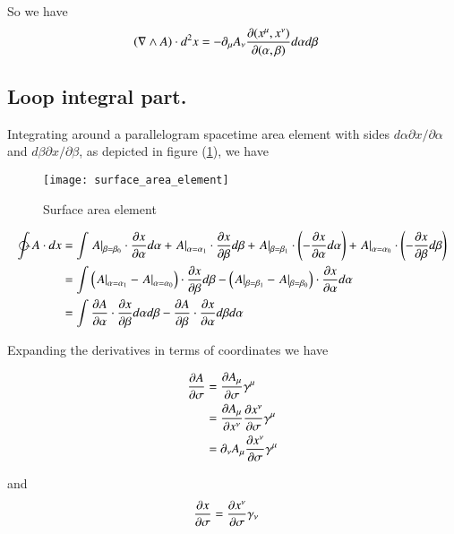 So we have
\begin{align}\label{eqn:withJac}
( \grad \wedge A ) \cdot d^2 x &= -\partial_\mu A_\nu \frac{\partial (x^\mu, x^\nu)}{\partial (\alpha, \beta)} d\alpha d\beta
\end{align}

\subsection{Loop integral part.}

Integrating around a parallelogram spacetime area element with sides $d\alpha \partial x/\partial \alpha$ and $d\beta \partial x/\partial \beta$, as
depicted in figure (\ref{fig:surface_area_element}), we have

\begin{figure}[htp]
\centering
\texttt{[image: surface\_area\_element]}
\caption{Surface area element}\label{fig:surface_area_element}
\end{figure}

\begin{align*}
\ointctrclockwise 
A \cdot dx
&=
\int
{\left. A \right\vert}_{\beta=\beta_0} \cdot \PD{\alpha}{x} d\alpha
+ {\left. A \right\vert}_{\alpha=\alpha_1} \cdot \PD{\beta}{x} d\beta
+ {\left. A \right\vert}_{\beta=\beta_1} \cdot \left( -\PD{\alpha}{x} d\alpha \right)
+ {\left. A \right\vert}_{\alpha=\alpha_0} \cdot \left( -\PD{\beta}{x} d\beta \right) 
\\
&=
\int
\left( {\left. A \right\vert}_{\alpha=\alpha_1} - {\left. A \right\vert}_{\alpha=\alpha_0} \right) \cdot \PD{\beta}{x} d\beta
-\left( {\left. A \right\vert}_{\beta=\beta_1} - {\left. A \right\vert}_{\beta=\beta_0} \right) \cdot \PD{\alpha}{x} d\alpha 
\\
&=
\int
\PD{\alpha}{A} \cdot \PD{\beta}{x} d\alpha d\beta
-\PD{\beta}{A} \cdot \PD{\alpha}{x} d\beta d\alpha
\end{align*}

Expanding the derivatives in terms of coordinates we have

\begin{align*}
\PD{\sigma}{A} 
&=
\PD{\sigma}{A_\mu} \gamma^\mu \\
&= 
\PD{x^\nu}{A_\mu}\PD{\sigma}{x^\nu} \gamma^\mu \\
&= 
\partial_\nu A_\mu \PD{\sigma}{x^\nu} \gamma^\mu \\
\end{align*}

and
\begin{align*}
\PD{\sigma}{x} &= \PD{\sigma}{x^\nu} \gamma_\nu
\end{align*}

